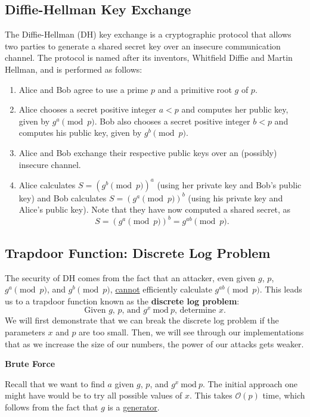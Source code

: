 \documentclass{article}
\begin{document}
\subsection*{Diffie-Hellman Key Exchange}
    The Diffie-Hellman (DH) key exchange is a cryptographic protocol that allows two parties to generate a shared secret key over an insecure communication channel. The protocol is named after its inventors, Whitfield Diffie and Martin Hellman, and is performed as follows:
    \begin{enumerate}[label = \arabic*.]
        \item Alice and Bob agree to use a prime $p$ and a primitive root $g$ of $p$.
        \item Alice chooses a secret positive integer $a < p$ and computes her public key, given by $g^{a} \pmod{p}$. Bob also chooses a secret positive integer $b < p$ and computes his public key, given by $g^{b} \pmod{p}$.
        \item Alice and Bob exchange their respective public keys over an (possibly) insecure channel.
        \item Alice calculates $S = (g^{b} \pmod{p})^{a}$ (using her private key and Bob's public key) and Bob calculates $S = (g^{a} \pmod{p})^{b}$ (using his private key and Alice's public key). Note that they have now computed a shared secret, as $$S = (g^{a} \pmod{p})^{b} = g^{ab} \pmod{p}.$$
    \end{enumerate}

\subsection*{Trapdoor Function: Discrete Log Problem}
    The security of DH comes from the fact that an attacker, even given $g$, $p$, $g^{a} \pmod{p}$, and $g^{b} \pmod{p}$, \underline{cannot} efficiently calculate $g^{ab} \pmod{p}$. This leads us to a trapdoor function known as the \textbf{discrete log problem}: $$\text{Given $g$, $p$, and $g^{x}\ \text{mod}\ p$, determine $x$}.$$ We will first demonstrate that we can break the discrete log problem if the parameters $x$ and $p$ are too small. Then, we will see through our implementations that as we increase the size of our numbers, the power of our attacks gets weaker.

    \begin{center}
        \textbf{Brute Force}
    \end{center}

    Recall that we want to find $a$ given $g$, $p$, and $g^{x}\ \text{mod}\ p$. The initial approach one might have would be to try all possible values of $x$. This takes $\mathcal{O}(p)$ time, which follows from the fact that $g$ is a \href{https://en.wikipedia.org/wiki/Primitive_root_modulo_n}{generator}.
    
\end{document}
